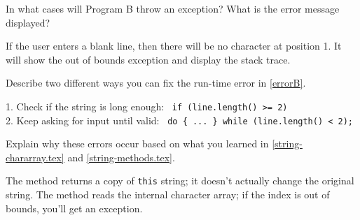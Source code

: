 %


\Q \label{errorB}
In what cases will Program B throw an exception? What is the error message displayed?

\begin{answer}
If the user enters a blank line, then there will be no character at position 1. It will show the out of bounds exception and display the stack trace.
\end{answer}


\Q Describe two different ways you can fix the run-time error in \ref{errorB}.

\begin{answer}
1. Check if the string is long enough: ~{\tt if (line.length() >= 2)} \\
2. Keep asking for input until valid: ~{\tt do \{~...~\} while (line.length() < 2);}
\end{answer}


\Q Explain why these errors occur based on what you learned in \ref{string-chararray.tex} and \ref{string-methods.tex}.

\begin{answer}
The  method returns a copy of {\tt this} string; it doesn't actually change the original string.
The  method reads the internal character array; if the index is out of bounds, you'll get an exception.
\end{answer}
